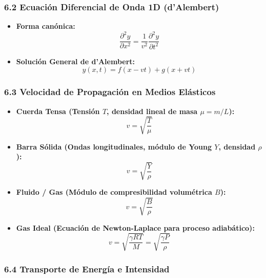 \documentclass[11pt,a4paper]{article}
\begin{document}
\subsubsection*{6.2 Ecuación Diferencial de Onda 1D (d'Alembert)}

\begin{itemize}
  \item \textbf{Forma canónica:}
  \[
    \frac{\partial^2 y}{\partial x^2} = \frac{1}{v^2} \frac{\partial^2 y}{\partial t^2}
  \]
  \item \textbf{Solución General de d'Alembert:}
  \[
    y(x, t) = f(x - vt) + g(x + vt)
  \]
\end{itemize}

\subsubsection*{6.3 Velocidad de Propagación en Medios Elásticos}

\begin{itemize}
  \item \textbf{Cuerda Tensa (Tensión $T$, densidad lineal de masa $\mu = m/L$):}
  \[
    v = \sqrt{\frac{T}{\mu}}
  \]
  \item \textbf{Barra Sólida (Ondas longitudinales, módulo de Young $Y$, densidad $\rho$):}
  \[
    v = \sqrt{\frac{Y}{\rho}}
  \]
  \item \textbf{Fluido / Gas (Módulo de compresibilidad volumétrica $B$):}
  \[
    v = \sqrt{\frac{B}{\rho}}
  \]
  \item \textbf{Gas Ideal (Ecuación de Newton-Laplace para proceso adiabático):}
  \[
    v = \sqrt{\frac{\gamma R T}{M}} = \sqrt{\frac{\gamma P}{\rho}}
  \]
\end{itemize}

\subsubsection*{6.4 Transporte de Energía e Intensidad}
\end{document}
